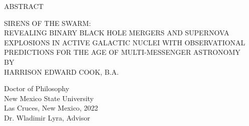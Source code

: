 \begin{center}
ABSTRACT
\end{center}

\bigskip

\begin{center}
SIRENS OF THE SWARM:\\
REVEALING BINARY BLACK HOLE MERGERS AND SUPERNOVA EXPLOSIONS IN ACTIVE GALACTIC NUCLEI WITH OBSERVATIONAL PREDICTIONS FOR THE AGE OF MULTI-MESSENGER ASTRONOMY \\
\bigskip
BY\\
\bigskip
HARRISON EDWARD COOK, B.A.
\end{center}

\bigskip

\begin{center}
Doctor of Philosophy\\
New Mexico State University\\
Las Cruces, New Mexico, 2022\\
Dr. Wladimir Lyra, Advisor
\end{center}

\bigskip
\bigskip




